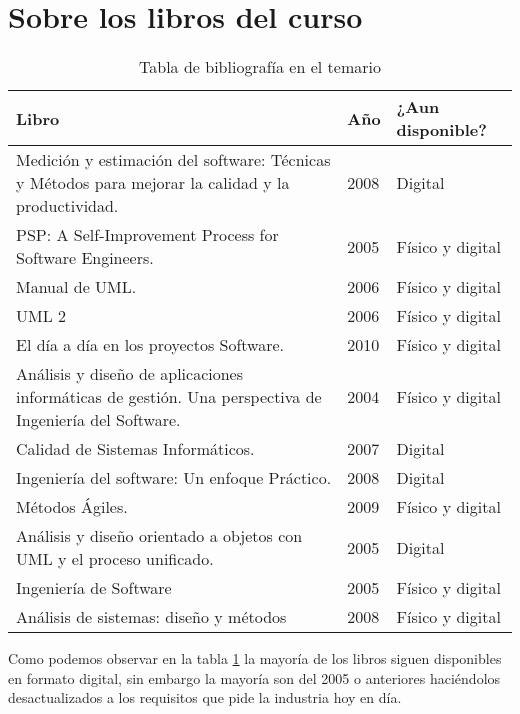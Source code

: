 \documentclass[12pt,twoside]{article}
\begin{document}
\section{Sobre los libros del curso}
\begin{table}[t]
    \begin{center}
    \begin{tabular}{| p{7cm} | p{2cm} | p{4cm} |}
    \hline Libro & Año & ¿Aun disponible? \\ \hline
    Medición y estimación del software: Técnicas y Métodos para mejorar la calidad y la productividad. & 2008 & Digital \\ \hline
    PSP: A Self-Improvement Process for Software
    Engineers. & 2005 & Físico y digital \\ \hline
    Manual de UML. & 2006 & Físico y digital\\ \hline
    UML 2 & 2006 & Físico y digital \\ \hline
    El día a día en los proyectos
    Software.& 2010 & Físico y digital \\ \hline
    Análisis y diseño de aplicaciones
    informáticas de gestión. Una perspectiva de Ingeniería del Software. & 2004 & Físico y digital \\ \hline
    Calidad de Sistemas Informáticos.& 2007 & Digital \\ \hline
    Ingeniería del software: Un enfoque Práctico. & 2008 & Digital \\ \hline
    Métodos Ágiles. & 2009 & Físico y digital \\ \hline
    Análisis y diseño orientado a objetos con UML y el
    proceso unificado. & 2005 & Digital \\ \hline
    Ingeniería de Software & 2005 & Físico y digital \\ \hline
    Análisis de sistemas: diseño y métodos & 2008 & Físico y digital \\ \hline
    \end{tabular}
    \caption{Tabla de bibliografía en el temario}
    \label{tabla: bibliografia}
    \end{center}
    \end{table}
Como podemos observar en la tabla \ref{tabla: bibliografia} la mayoría de los libros siguen disponibles en 
formato digital, sin embargo la mayoría son del 2005 o anteriores haciéndolos desactualizados a los requisitos
que pide la industria hoy en día.
    
\end{document}
